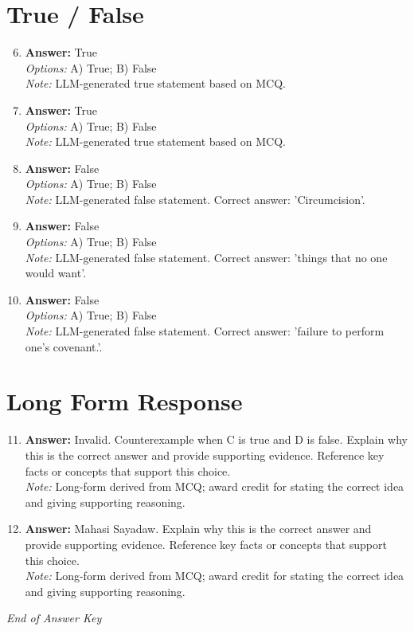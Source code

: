 \documentclass[12pt]{article}
\begin{document}
\section*{True / False}
\begin{enumerate}[label=\arabic*.]
\setcounter{enumi}{5}
\item \textbf{Answer:} True
\\ \textit{Options:} A) True; B) False
\\ \textit{Note:} LLM-generated true statement based on MCQ.
\item \textbf{Answer:} True
\\ \textit{Options:} A) True; B) False
\\ \textit{Note:} LLM-generated true statement based on MCQ.
\item \textbf{Answer:} False
\\ \textit{Options:} A) True; B) False
\\ \textit{Note:} LLM-generated false statement. Correct answer: 'Circumcision'.
\item \textbf{Answer:} False
\\ \textit{Options:} A) True; B) False
\\ \textit{Note:} LLM-generated false statement. Correct answer: 'things that no one would want'.
\item \textbf{Answer:} False
\\ \textit{Options:} A) True; B) False
\\ \textit{Note:} LLM-generated false statement. Correct answer: 'failure to perform one's covenant.'.
\end{enumerate}

\section*{Long Form Response}
\begin{enumerate}[label=\arabic*.]
\setcounter{enumi}{10}
\item \textbf{Answer:} Invalid. Counterexample when C is true and D is false. Explain why this is the correct answer and provide supporting evidence. Reference key facts or concepts that support this choice.
\\ \textit{Note:} Long-form derived from MCQ; award credit for stating the correct idea and giving supporting reasoning.
\item \textbf{Answer:} Mahasi Sayadaw. Explain why this is the correct answer and provide supporting evidence. Reference key facts or concepts that support this choice.
\\ \textit{Note:} Long-form derived from MCQ; award credit for stating the correct idea and giving supporting reasoning.
\end{enumerate}

\vfill
\noindent\textit{End of Answer Key}
\end{document}
